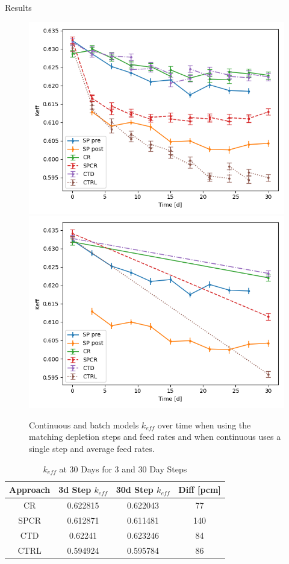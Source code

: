 \documentclass[final]{beamer}
\newlength{\onecolwid}
\newlength{\threecolwid}
\begin{document}
\begin{frame}[t]
\begin{columns}[t,totalwidth=\threecolwid]
\begin{column}{\onecolwid}
\begin{block}{Results}
\begin{figure}
	\label{fig:keff_30d_batch}
	\includegraphics[width=0.45\linewidth]{images/cumulative_keff_batch.png}
	\includegraphics[width=0.45\linewidth]{images/cumulative_keff_coont.png}
	\caption{Continuous and batch models $k_{eff}$ over time when using the matching depletion steps and feed rates and when continuous uses a single step and average feed rates.}
\end{figure}


%
%

\begin{table}[H]
\renewcommand{\arraystretch}{1.25}
\caption{$k_{eff}$ at 30 Days for 3 and 30 Day Steps}
\label{tab:keff_vals}
\begin{tabular}{ | c | c | c | c | }
 \hline
 Approach & 3d Step $k_{eff}$ & 30d Step $k_{eff}$ & Diff [pcm]\\
 \hline
 \hline
 CR & 0.622815 & 0.622043 & 77\\
 SPCR & 0.612871 & 0.611481 & 140\\
 CTD & 0.62241 & 0.623246 & 84\\
 CTRL & 0.594924 & 0.595784 & 86\\


\end{tabular}
\end{table}
\end{block}
\end{column}
\end{columns}
\end{frame}
\end{document}
